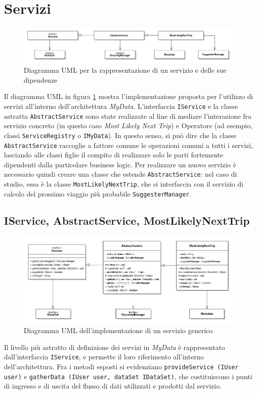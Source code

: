 \section{Servizi}
\label{sec:P-Service}
\begin{figure} [h]
	\includegraphics[width=\linewidth]{pictures/Services-closed.png}
	\caption{Diagramma UML per la rappresentazione di un servizio e delle sue dipendenze}
	\label{fig:Services-closed}
\end{figure}
Il diagramma UML in figura \ref{fig:Services-closed} mostra l’implementazione proposta per l’utilizzo di servizi all’interno dell’architettura \textit{MyData}. L’interfaccia \texttt{IService} e la classe astratta \texttt{AbstractService} sono state realizzate al fine di mediare l’interazione fra servizio concreto (in questo caso \textit{Most Likely Next Trip}) e Operatore (ad esempio, classi \texttt{ServiceRegistry} o \texttt{IMyData}). In questo senso, si pu\`o dire che la classe \texttt{AbstractService} raccoglie a fattore comune le operazioni comuni a tutti i servizi, lasciando alle classi figlie il compito di realizzare solo le parti fortemente dipendenti dalla particolare business logic. Per realizzare un nuovo servizio \`e necessario quindi creare una classe che estende \texttt{AbstractService}: nel caso di studio, essa \`e la classe \texttt{MostLikelyNextTrip}, che si interfaccia con il servizio di calcolo del prossimo viaggio pi\`u probabile \cite{MLNT} \texttt{SuggesterManager}.

\subsection{IService, AbstractService, MostLikelyNextTrip}
\begin{figure} [h]
	\includegraphics[width=\linewidth]{pictures/Services-open.png}
	\caption{Diagramma UML dell'implementazione di un servizio generico}
	\label{fig:Services-open}
\end{figure}
Il livello pi\`u astratto di definizione dei servizi in \textit{MyData} \`e rappresentato dall’interfaccia \texttt{IService}, e permette il loro riferimento all’interno dell’architettura. Fra i metodi esposti si evidenziano \texttt{provideService (IUser user)} e \texttt{gatherData (IUser user, dataSet IDataSet)}, che costituiscono i punti di ingresso e di uscita del flusso di dati utilizzati e prodotti dal servizio.

